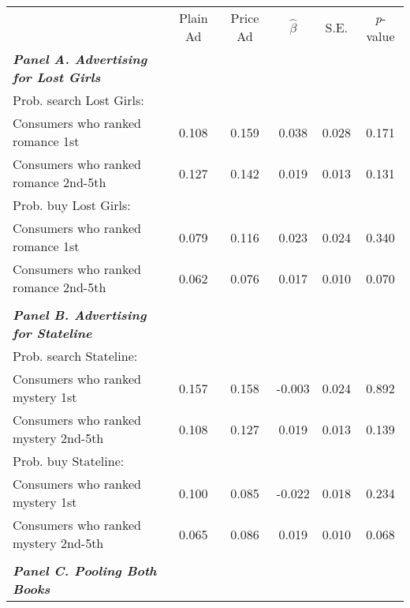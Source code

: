\begin{center}
\begin{tabular}{lccccc}
\hline \noalign{\smallskip} & Plain Ad & Price Ad & $\hat{\beta}$ & S.E. & \emph{p}-value\\
\noalign{\smallskip}\hline \noalign{\smallskip}\textbf{\emph{Panel A. Advertising for Lost Girls}} &  &  &  &  & \\
\hspace{5pt} Prob. search Lost Girls: &  &  &  &  & \\
\hspace{5pt} Consumers who ranked romance 1st & 0.108 & 0.159 & 0.038 & 0.028 & 0.171\\
\hspace{5pt} Consumers who ranked romance 2nd-5th & 0.127 & 0.142 & 0.019 & 0.013 & 0.131\\
\hspace{5pt} Prob. buy Lost Girls: &  &  &  &  & \\
\hspace{5pt} Consumers who ranked romance 1st & 0.079 & 0.116 & 0.023 & 0.024 & 0.340\\
\hspace{5pt} Consumers who ranked romance 2nd-5th & 0.062 & 0.076 & 0.017 & 0.010 & 0.070\\
  &  &  &  &  & \\
\textbf{\emph{Panel B. Advertising for Stateline}} &  &  &  &  & \\
\hspace{5pt} Prob. search Stateline: &  &  &  &  & \\
\hspace{5pt} Consumers who ranked mystery 1st & 0.157 & 0.158 & -0.003 & 0.024 & 0.892\\
\hspace{5pt} Consumers who ranked mystery 2nd-5th & 0.108 & 0.127 & 0.019 & 0.013 & 0.139\\
\hspace{5pt} Prob. buy Stateline: &  &  &  &  & \\
\hspace{5pt} Consumers who ranked mystery 1st & 0.100 & 0.085 & -0.022 & 0.018 & 0.234\\
\hspace{5pt} Consumers who ranked mystery 2nd-5th & 0.065 & 0.086 & 0.019 & 0.010 & 0.068\\
  &  &  &  &  & \\
\textbf{\emph{Panel C. Pooling Both Books}} &  &  &  &  & \\

\end{tabular}
\end{center}

